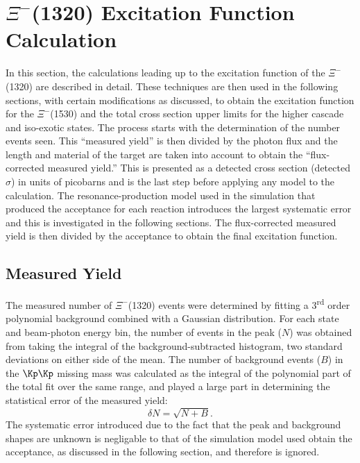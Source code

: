 \section{\label{sec:results.xi1320}\texorpdfstring{$\Xi^-$}{Xi-}(1320) Excitation Function Calculation}

In this section, the calculations leading up to the excitation function of the $\Xi^-$(1320) are described in detail. These techniques are then used in the following sections, with certain modifications as discussed, to obtain the excitation function for the $\Xi^-$(1530) and the total cross section upper limits for the higher cascade and iso-exotic states. The process starts with the determination of the number events seen. This ``measured yield'' is then divided by the photon flux and the length and material of the target are taken into account to obtain the ``flux-corrected measured yield.'' This is presented as a detected cross section (detected $\sigma$) in units of picobarns and is the last step before applying any model to the calculation. The resonance-production model used in the simulation that produced the acceptance for each reaction introduces the largest systematic error and this is investigated in the following sections. The flux-corrected measured yield is then divided by the acceptance to obtain the final excitation function.

\subsection{\label{sec:results.xi1320.yield}Measured Yield}

The measured number of $\Xi^-$(1320) events were determined by fitting a 3\textsuperscript{rd} order polynomial background combined with a Gaussian distribution. For each state and beam-photon energy bin, the number of events in the peak ($N$) was obtained from taking the integral of the background-subtracted histogram, two standard deviations on either side of the mean. The number of background events ($B$) in the $\Kp\Kp$ missing mass was calculated as the integral of the polynomial part of the total fit over the same range, and played a large part in determining the statistical error of the measured yield:
\begin{equation}
    \delta N = \sqrt{N + B}.
\end{equation}
The systematic error introduced due to the fact that the peak and background shapes are unknown is negligable to that of the simulation model used obtain the acceptance, as discussed in the following section, and therefore is ignored.

